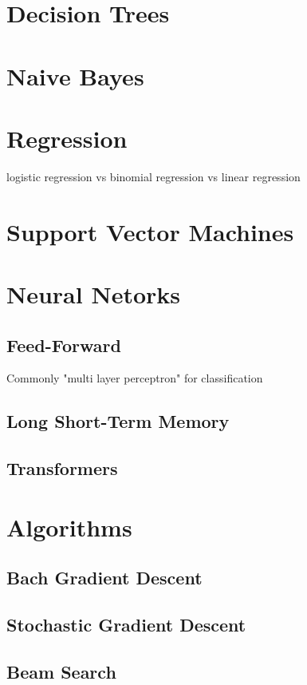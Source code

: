 \documentclass[11pt]{article}
\begin{document}
\section{Decision Trees}

\section{Naive Bayes}

\section{Regression}
logistic regression vs binomial regression vs linear regression

\section{Support Vector Machines}

\section{Neural Netorks}

\subsection{Feed-Forward}
Commonly "multi layer perceptron" for classification

\subsection{Long Short-Term Memory}

\subsection{Transformers}

\section{Algorithms}
\subsection{Bach Gradient Descent}
\subsection{Stochastic Gradient Descent}

\subsection{Beam Search}
\end{document}
